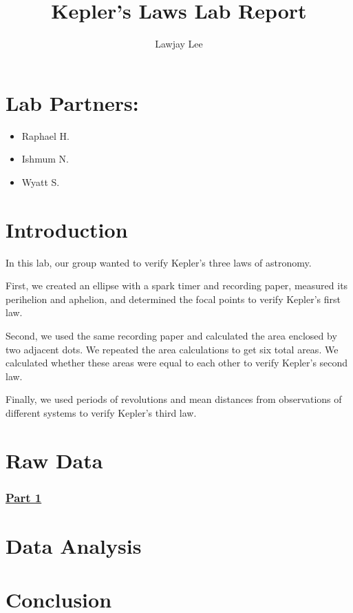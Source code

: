 \documentclass[fleqn]{article}
\title{Kepler's Laws Lab Report}
\author{Lawjay Lee}
\date{}
\begin{document}
\maketitle

\section*{Lab Partners:}
\begin{itemize}
	\item Raphael H.
	\item Ishmum N.
	\item Wyatt S.
\end{itemize}

\section*{Introduction}
In this lab, our group wanted to verify Kepler's three laws of astronomy.

First, we created an ellipse with a spark timer and recording paper, measured its perihelion and aphelion, and determined the focal points to verify Kepler's first law.

Second, we used the same recording paper and calculated the area enclosed by two adjacent dots. We repeated the area calculations to get six total areas. We calculated whether these areas were equal to each other to verify Kepler's second law.

Finally, we used periods of revolutions and mean distances from observations of different systems to verify Kepler's third law.
\section*{Raw Data}

\subsubsection*{\underline{Part 1}}

\section*{Data Analysis}

\section*{Conclusion}
\end{document}
